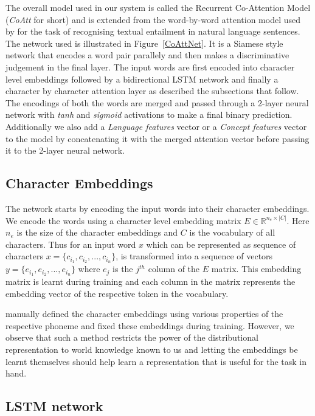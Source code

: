 \documentclass[11pt,letterpaper]{article}
\begin{document}
The overall model used in our system is called the Recurrent Co-Attention Model (\textit{CoAtt} for short) and is extended from the word-by-word attention model used by \citet{rocktaschel2016reasoning} for the task of recognising textual entailment in natural language sentences. The network used is illustrated in Figure~\ref{CoAttNet}. It is a Siamese style network that encodes a word pair parallely and then makes a discriminative judgement in the final layer. The input words are first encoded into character level embeddings followed by a bidirectional LSTM network and finally a character by character attention layer as described the subsections that follow. The encodings of both the words are merged and passed through a 2-layer neural network with \textit{tanh} and \textit{sigmoid} activations to make a final binary prediction. Additionally we also add a \textit{Language features} vector or a \textit{Concept features} vector to the model by concatenating it with the merged attention vector before passing it to the 2-layer neural network.

\subsection{Character Embeddings}

The network starts by encoding the input words into their character embeddings. We encode the words using a character level embedding matrix $E \in \mathbb{R}^{n_e \times |C|}$. Here $n_e$ is the size of the character embeddings and $C$ is the vocabulary of all characters. Thus for an input word $x$ which can be represented as sequence of characters $x = \{c_{i_1}, c_{i_2}, ..., c_{i_n}\}$, is transformed into a sequence of vectors $y = \{e_{i_1}, e_{i_2}, ..., e_{i_n}\}$ where $e_j$ is the $j^{th}$ column of the $E$ matrix. This embedding matrix is learnt during training and each column in the matrix represents the embedding vector of the respective token in the vocabulary. 

\citet{rama2016siamese} manually defined the character embeddings using various properties of the respective phoneme and fixed these embeddings during training. However, we observe that such a method restricts the power of the distributional representation to world knowledge known to us and letting the embeddings be learnt themselves should help learn a representation that is useful for the task in hand.

\subsection{LSTM network}
\end{document}
